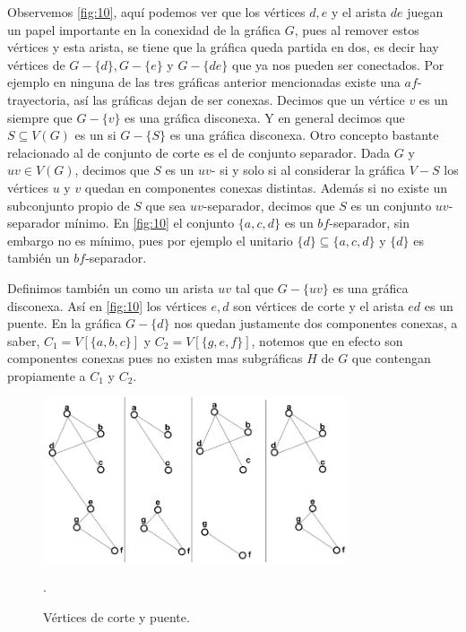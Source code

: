 Observemos \cref{fig:10}, aquí podemos ver que los vértices $d,e$ y el arista $de$ juegan un papel importante en la conexidad de la gráfica $G$, pues al remover estos vértices y esta arista, se tiene que la gráfica queda partida en dos, es decir hay vértices de $G-\{d\}, G-\{e\}$ y $G-\{ de\}$ que ya nos pueden ser conectados. Por ejemplo en ninguna de las tres gráficas anterior mencionadas existe una $af$-trayectoria, así las gráficas dejan de ser conexas.
Decimos que un vértice $v$ es un  siempre que $G-\{v\}$ es una gráfica disconexa. Y en general decimos que $S\subseteq V(G)$ es un  si $G-\{S\}$ es una gráfica disconexa.
Otro concepto bastante relacionado al de conjunto de corte es el de conjunto separador. Dada $G$ y $uv\in V(G)$, decimos que $S$ es un $uv$- si y solo si al considerar la gráfica $V-S$ los vértices $u$ y $v$ quedan en componentes conexas distintas. Además si no existe un subconjunto propio de $S$ que sea $uv$-separador, decimos que $S$ es un conjunto $uv$-separador mínimo. En \cref{fig:10} el conjunto $\{a,c,d\}$ es un $bf$-separador, sin embargo no es mínimo, pues por ejemplo el unitario $\{d \} \subseteq \{a,c,d\}$ y $\{d \}$ es también un $bf$-separador. 

Definimos también un  como un arista $uv$ tal que $G-\{uv\}$ es una gráfica disconexa.
Así en \cref{fig:10} los vértices $e,d$ son vértices de corte y el arista $ed$ es un puente. En la gráfica $G-\{ d\}$ nos quedan justamente dos componentes conexas, a saber, $C_1=V[\{a,b,c \}]$ y $C_2=V[\{g,e,f\}]$, notemos que en efecto son componentes conexas pues no existen mas subgráficas $H$ de $G$ que contengan propiamente a $C_1$ y $C_2$. 

\begin{figure}[H]
  \centering
  \includegraphics[width=0.8\textwidth]{recursos/capturas/14.jpg}
  \caption{Vértices de corte y puente.}.
  \label{fig:09}
\end{figure}


